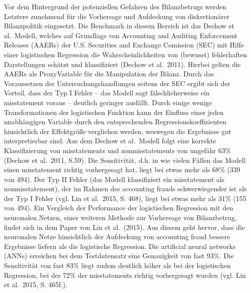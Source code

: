 \documentclass[a4paper, nobind]{templates/ociamthesis}
\begin{document}
Vor dem Hintergrund der potenziellen Gefahren des Bilanzbetrugs werden Letztere zunehmend für die Vorhersage und Aufdeckung von diskretionärer Bilanzpolitik eingesetzt. Die Benchmark in diesem Bereich ist das Dechow et al.~Modell, welches auf Grundlage von Accounting and Auditing Enforcement Releases (AAERs) der U.S. Securities and Exchange Comission (SEC) mit Hilfe einer logistischen Regression die Wahrscheinlichkeiten von (bewusst) fehlerhaften Darstellungen schätzt und klassifiziert (Dechow et al.~2011). Hierbei gelten die AAERs als ProxyVariable für die Manipulation der Bilanz. Durch das Voraussetzen der Untersuchungshandlungen seitens der SEC ergibt sich der Vorteil, dass der Typ I Fehler -- das Modell sagt fälschlicherweise ein misstatement voraus -- deutlich geringer ausfällt. Durch einige wenige Transformationen der logistischen Funktion kann der Einfluss einer jeden unabhängigen Variable durch den entsprechenden Regressionskoeffizienten hinsichtlich der Effektgröße verglichen werden, weswegen die Ergebnisse gut interpretierbar sind. Aus dem Dechow et al.~Modell folgt eine korrekte Klassifizierung von misstatements und nonmisstatements von ungefähr 63\% (Dechow et al.~2011, S.59). Die Sensitivität, d.h. in wie vielen Fällen das Modell einen misstatement richtig vorhergesagt hat, liegt bei etwas mehr als 68\% (339 von 494). Der Typ II Fehler (das Modell klassifiziert ein misstatement als nonmisstatement), der im Rahmen des accounting frauds schwerwiegender ist als der Typ I Fehler (vgl. Lin et al.~2015, S. 468), liegt bei etwas mehr als 31\% (155 von 494).
Ein Vergleich der Performance der logistischen Regression mit den neuronalen Netzen, einer weiteren Methode zur Vorhersage von Bilanzbetrug, findet sich in dem Paper von Lin et al.~(2015). Aus diesem geht hervor, dass die neuronalen Netze hinsichtlich der Aufdeckung von accounting fraud bessere Ergebnisse liefern als die logistische Regression. Die artificial neural networks (ANNs) erreichen bei dem Testdatensatz eine Genauigkeit von fast 93\%. Die Sensitivität von fast 83\% liegt zudem deutlich höher als bei der logistischen Regression, bei der 72\% der misstatements richtig vorhergesagt wurden (vgl. Lin et al.~2015, S. 465f.).
\end{document}

